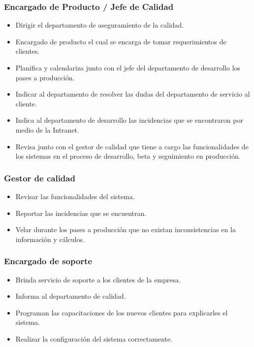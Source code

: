 \documentclass[conference]{IEEEtran}
\begin{document}
    \subsubsection{ \textbf{Encargado de Producto / Jefe de Calidad}}
    \hbox{}
        \begin{itemize}
        \item Dirigir el departamento de aseguramiento de la calidad.
        \item Encargado de producto el cual se encarga de tomar requerimientos de clientes.
        \item Planifica y calendariza junto con el jefe del departamento de desarrollo los pases a producción.
        \item Indicar al departamento de resolver las dudas del departamento de servicio al cliente.
        \item Indica al departamento de desarrollo las incidencias que se encontraron por medio de la Intranet.
        \item Revisa junto con el gestor de calidad que tiene a cargo las funcionalidades de los sistemas en el proceso de desarrollo, beta y seguimiento en producción.
        \end{itemize}
    \hbox{}
   \subsubsection{ \textbf{Gestor de calidad}}
   \hbox{}
        \begin{itemize}
        \item Revisar las funcionalidades del sistema.
        \item Reportar las incidencias que se encuentran.
        \item Velar durante los pases a producción que no existan inconsistencias en la información y cálculos.
        \end{itemize}
    \hbox{}
    \subsubsection{ \textbf{Encargado de soporte}}
    \hbox{}
        \begin{itemize}
        \item Brinda servicio de soporte a los clientes de la empresa.
        \item Informa al departamento de calidad.
        \item Programan las capacitaciones de los nuevos clientes para explicarles el sistema.
        \item Realizar la configuración del sistema correctamente.
        \end{itemize}
    \hbox{}
\end{document}
